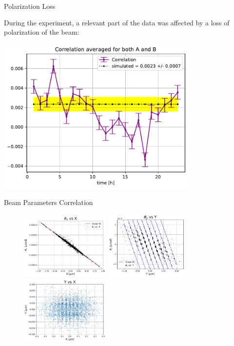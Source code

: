 \documentclass[9pt,a4paper]{beamer}
\begin{document}
\begin{frame}{Polarization Loss}

During the experiment, a relevant part of the data was affected by a loss of polarization of the beam:

\begin{center}
\includegraphics[width = 0.75\textwidth]{figures/OverallCorr.pdf}
\end{center}

\end{frame}


\begin{frame}{Beam Parameters Correlation}

\begin{figure}
\includegraphics[width = 0.4\textwidth]{figures/X_Xp.pdf}
\includegraphics[width = 0.37\textwidth]{figures/Y_Yp.pdf} \\
\includegraphics[width = 0.4\textwidth]{figures/Y_X.pdf}
\end{figure}

\end{frame}
\end{document}
